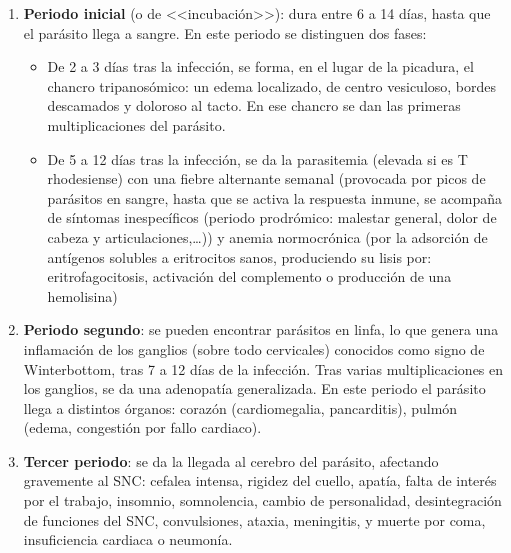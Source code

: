 \begin{enumerate}[itemsep=0pt,parsep=0pt,topsep=0pt,partopsep=0pt]
	\item \textbf{Periodo inicial} (o de <<incubación>>): dura entre 6 a 14 días, hasta que el parásito llega a sangre. En este periodo se distinguen dos fases:
	\begin{itemize}[itemsep=0pt,parsep=0pt,topsep=0pt,partopsep=0pt]
		\item De 2 a 3 días tras la infección, se forma, en el lugar de la picadura, el chancro tripanosómico: un edema localizado, de centro vesiculoso, bordes descamados y doloroso al tacto. En ese chancro se dan las primeras multiplicaciones del parásito.
		\item De 5 a 12 días tras la infección, se da la parasitemia (elevada si es T rhodesiense) con una fiebre alternante semanal (provocada por picos de parásitos en sangre, hasta que se activa la respuesta inmune, se acompaña de síntomas inespecíficos (periodo prodrómico: malestar general, dolor de cabeza y articulaciones,…)) y anemia normocrónica (por la adsorción de antígenos solubles a eritrocitos sanos, produciendo su lisis por: eritrofagocitosis, activación del complemento o producción de una hemolisina)
	\end{itemize}
	\item \textbf{Periodo segundo}: se pueden encontrar parásitos en linfa, lo que genera una inflamación de los ganglios (sobre todo cervicales) conocidos como signo de Winterbottom, tras 7 a 12 días de la infección. Tras varias multiplicaciones en los ganglios, se da una adenopatía generalizada. En este periodo el parásito llega a distintos órganos: corazón (cardiomegalia, pancarditis), pulmón (edema, congestión por fallo cardiaco).
	\item \textbf{Tercer periodo}: se da la llegada al cerebro del parásito, afectando gravemente al SNC: cefalea intensa, rigidez del cuello, apatía, falta de interés por el trabajo, insomnio, somnolencia, cambio de personalidad, desintegración de funciones del SNC, convulsiones, ataxia, meningitis, y muerte por coma, insuficiencia cardiaca o neumonía.
\end{enumerate}
